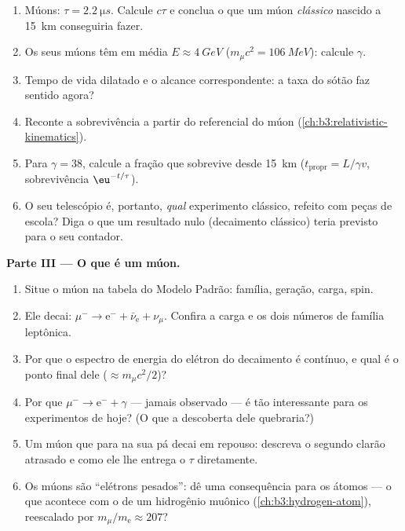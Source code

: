 \begin{problem}
\begin{enumerate}[resume]
  \item Múons: $\tau = \qty{2.2}{\micro s}$. Calcule $c\tau$ e
        conclua o que um múon \emph{clássico} nascido a
        \qty{15}{km} conseguiria fazer.
  \item Os seus múons têm em média $E \approx \qty{4}{GeV}$
        ($m_\mu c^2 = \qty{106}{MeV}$): calcule $\gamma$.
  \item Tempo de vida dilatado e o alcance correspondente: a
        taxa do sótão faz sentido agora?
  \item Reconte a sobrevivência a partir do referencial do múon
        (\cref{ch:b3:relativistic-kinematics}).
  \item Para $\gamma = 38$, calcule a fração que sobrevive desde
        \qty{15}{km} ($t_{\text{propr}} = L/\gamma v$, sobrevivência
        $\eu^{-t/\tau}$).
  \item O seu telescópio é, portanto, \emph{qual} experimento
        clássico, refeito com peças de escola? Diga o que um resultado
        nulo (decaimento clássico) teria previsto para o seu
        contador.
\end{enumerate}

\medskip\noindent\textbf{Parte III --- O que é um múon.}

\begin{enumerate}[resume]
  \item Situe o múon na tabela do Modelo Padrão: família,
        geração, carga, spin.
  \item Ele decai: $\mu^- \to \text{e}^- + \bar\nu_{\text{e}} +
        \nu_\mu$. Confira a carga e os dois números de família leptônica.
  \item Por que o espectro de energia do elétron do decaimento é contínuo,
        e qual é o ponto final dele ($\approx m_\mu c^2/2$)?
  \item Por que $\mu^- \to \text{e}^- + \gamma$ --- jamais
        observado --- é tão interessante para os experimentos de hoje?
        (O que a descoberta dele quebraria?)
  \item Um múon que para na sua pá decai em repouso: descreva
        o segundo clarão atrasado e como ele lhe entrega o $\tau$
        diretamente.
  \item Os múons são ``elétrons pesados'': dê uma consequência para os
        átomos --- o que acontece com o  de um hidrogênio
        muônico (\cref{ch:b3:hydrogen-atom}), reescalado por
        $m_\mu/m_{\text{e}} \approx 207$?
\end{enumerate}


\end{problem}
